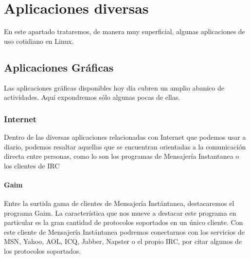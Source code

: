 



\chapter{Aplicaciones diversas} 
\label{aplicaciones.tex}

En  este  apartado  trataremos,  de manera  muy  superficial,  algunas
aplicaciones de uso cotidiano en Linux.

\section{Aplicaciones Gráficas} 

Las aplicaciones gráficas disponibles hoy día cubren un amplio abanico
de actividades. Aquí expondremos sólo algunas pocas de ellas.

\subsection{Internet}

Dentro  de las  diversas  aplicaciones relacionadas  con Internet  que
podemos usar  a diario,  podemos resaltar  aquellas que  se encuentran
orientadas a la  comunicación directa entre personas, como  lo son los
programas de Mensajería Instantanea o los clientes de IRC

\subsubsection*{Gaim}

Entre  la   surtida  gama  de  clientes   de  Mensajería  Instántanea,
destacaremos el programa {\sf Gaim}. La característica que nos mueve a
destacar este programa en particular es la gran cantidad de protocolos
soportados  en  un  único  cliente. Con  este  cliente  de  Mensajería
Instántanea podremos conectarnos con los  servicios de {\sf MSN}, {\sf
Yahoo}, {\sf AOL}, {\sf ICQ}, {\sf  Jabber}, {\sf Napster} o el propio
IRC, por citar algunos de los protocolos soportados.


